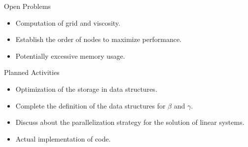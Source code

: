 \documentclass{beamer}
\begin{document}
\begin{frame}{Open Problems}
\begin{itemize}
    \item Computation of grid and viscosity.
    \item Establish the order of nodes to maximize performance.
    \item Potentially excessive memory usage.
\end{itemize}
\end{frame}


\begin{frame}{Planned Activities}
\begin{itemize}
    \item Optimization of the storage in data structures.
    \item Complete the definition of the data structures for $\beta$ and $\gamma$.
    \item Discuss about the parallelization strategy for the solution of linear systems.
    \item Actual implementation of code.
\end{itemize}
\end{frame}
\end{document}
